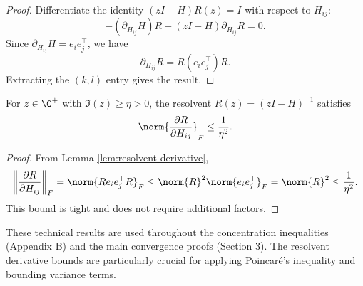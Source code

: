 \begin{proof}
Differentiate the identity $(zI - H)R(z) = I$ with respect to $H_{ij}$:
\[
-(\partial_{H_{ij}} H) R + (zI - H) \partial_{H_{ij}} R = 0.
\]
Since $\partial_{H_{ij}} H = e_i e_j^\top$, we have
\[
\partial_{H_{ij}} R = R (e_i e_j^\top) R.
\]
Extracting the $(k, l)$ entry gives the result.
\end{proof}

\begin{lemma}\label{lem:resolvent-lipschitz}
For $z \in \C^+$ with $\Im(z) \geq \eta > 0$, the resolvent $R(z) = (zI - H)^{-1}$ satisfies
\[
\norm{\frac{\partial R}{\partial H_{ij}}}_F \leq \frac{1}{\eta^2}.
\]
\end{lemma}

\begin{proof}
From Lemma \ref{lem:resolvent-derivative},
\[
\left\|\frac{\partial R}{\partial H_{ij}}\right\|_F = \norm{R e_i e_j^\top R}_F \leq \norm{R}^2 \norm{e_i e_j^\top}_F = \norm{R}^2 \leq \frac{1}{\eta^2}.
\]
This bound is tight and does not require additional factors.
\end{proof}

\begin{remark}
These technical results are used throughout the concentration inequalities (Appendix B) and the main convergence proofs (Section 3). The resolvent derivative bounds are particularly crucial for applying Poincaré's inequality and bounding variance terms.
\end{remark}